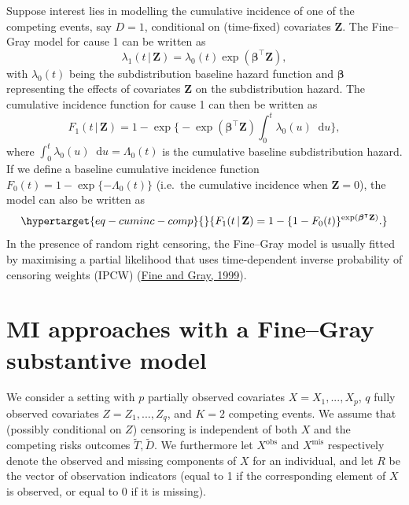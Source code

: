 \documentclass[
  letterpaper,
  DIV=11,
  numbers=noendperiod]{scrreprt}
\newcommand{\given}{\,|\,}
\newcommand\diff{\mathop{}\!\mathrm{d}}
\begin{document}
Suppose interest lies in modelling the cumulative incidence of one of
the competing events, say \(D = 1\), conditional on (time-fixed)
covariates \(\mathbf{Z}\). The Fine--Gray model for cause 1 can be
written as \begin{equation*}
    \lambda_1(t \given \mathbf{Z}) = \lambda_{0}(t)\exp(\boldsymbol{\beta}^\intercal \mathbf{Z}),
\end{equation*} with \(\lambda_{0}(t)\) being the subdistribution
baseline hazard function and \(\boldsymbol{\beta}\) representing the
effects of covariates \(\mathbf{Z}\) on the subdistribution hazard. The
cumulative incidence function for cause 1 can then be written as
\begin{equation*}
    F_1(t \given \mathbf{Z}) = 1 - \exp \Biggl\{ -\exp(\boldsymbol{\beta}^\intercal \mathbf{Z}) \int_{0}^{t} \lambda_{0}(u)\diff u \Biggr\},
\end{equation*} where
\(\int_{0}^{t} \lambda_{0}(u)\diff u = \Lambda_0(t)\) is the cumulative
baseline subdistribution hazard. If we define a baseline cumulative
incidence function \(F_{0}(t) = 1 - \exp\{-\Lambda_0(t)\}\) (i.e.~the
cumulative incidence when \(\mathbf{Z} = 0\)), the model can also be
written as \begin{equation}\protect\hypertarget{eq-cuminc-comp}{}{
F_1(t \given \mathbf{Z}) = 1 - \{1 - F_{0}(t)\}^{\exp(\boldsymbol{\beta}^\intercal \mathbf{Z})}.
}\label{eq-cuminc-comp}\end{equation} In the presence of random right
censoring, the Fine--Gray model is usually fitted by maximising a
partial likelihood that uses time-dependent inverse probability of
censoring weights (IPCW)
(\protect\hyperlink{ref-fineProportionalHazardsModel1999}{Fine and Gray,
1999}).

\hypertarget{sec-methods}{%
\section{MI approaches with a Fine--Gray substantive
model}\label{sec-methods}}

We consider a setting with \(p\) partially observed covariates
\(X = X_1,...,X_p\), \(q\) fully observed covariates
\(Z = Z_1,...,Z_q\), and \(K = 2\) competing events. We assume that
(possibly conditional on \(Z\)) censoring is independent of both \(X\)
and the competing risks outcomes \(\tilde{T}, \tilde{D}\). We
furthermore let \(X^{\text{obs}}\) and \(X^{\text{mis}}\) respectively
denote the observed and missing components of \(X\) for an individual,
and let \(R\) be the vector of observation indicators (equal to 1 if the
corresponding element of \(X\) is observed, or equal to 0 if it is
missing).
\end{document}
